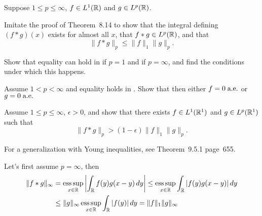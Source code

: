 \begin{enumerate}
\begin{excopy}
Suppose \(1\leq p \leq \infty\), \(f\in L^1(\mathbb{R})\) and \(g\in L^p(\mathbb{R})\).
\begin{itemize}
Imitate the proof of Theorem~8.14 to show that the integral defining
\((f\ast g)(x)\) exists for almost all $x$, that \(f\ast g \in L^p(\mathbb{R})\),
and that 
\begin{equation*}
\| f \ast g \|_p \leq \|f\|_1 \|g\|_p.
\end{equation*}

Show that equality can hold in  if \(p=1\) and if \(p=\infty\),
and find the conditions under which this happens.

Assume \(1 < p < \infty\) and equality holds in .
Show that then either 
\(f=0\;\textrm{a.e.}\) or 
\(g=0\;\textrm{a.e.}\)

Assume \(1\leq p \leq \infty\), \(\epsilon>0\), and show that there exists
\(f\in L^1(\mathbb{R}^1)\) and \(g\in L^p(\mathbb{R}^1)\) such that 
\begin{equation*}
\| f \ast g \|_p > (1-\epsilon) \|f\|_1 \|g\|_p.
\end{equation*}
\end{itemize}
\end{excopy}

For a generalization with 
Young inequalities, see \cite{EdwFA} Theorem~9.5.1 page~655.

\begin{itemize}
Let's first assume \(p=\infty\), then
\begin{align*}
\|f \ast g\|_\infty
&= \operatorname*{ess\,sup}_{x\in\mathbb{R}} \left| \int_{\mathbb{R}} f(y)g(x-y)\,dy\right|
\leq \operatorname*{ess\,sup}_{x\in\mathbb{R}}  \int_{\mathbb{R}} |f(y)g(x-y)|\,dy \\
&\leq \|g\|_\infty \operatorname*{ess\,sup}_{x\in\mathbb{R}} \int_{\mathbb{R}} |f(y)|\,dy
 = \|f\|_1 \|g\|_\infty
\end{align*}


\end{itemize}
\end{enumerate}
